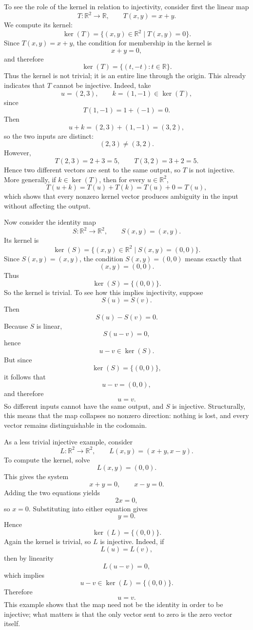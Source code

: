\documentclass[12pt]{article}
\begin{document}
	To see the role of the kernel in relation to injectivity, consider first the linear map
	\[
	T:\mathbb{R}^2\to\mathbb{R},\qquad T(x,y)=x+y.
	\]
	We compute its kernel:
	\[
	\ker(T)=\{(x,y)\in\mathbb{R}^2\mid T(x,y)=0\}.
	\]
	Since \(T(x,y)=x+y\), the condition for membership in the kernel is
	\[
	x+y=0,
	\]
	and therefore
	\[
	\ker(T)=\{(t,-t):t\in\mathbb{R}\}.
	\]
	Thus the kernel is not trivial; it is an entire line through the origin. This already indicates that \(T\) cannot be injective. Indeed, take
	\[
	u=(2,3), \qquad k=(1,-1)\in\ker(T),
	\]
	since
	\[
	T(1,-1)=1+(-1)=0.
	\]
	Then
	\[
	u+k=(2,3)+(1,-1)=(3,2),
	\]
	so the two inputs are distinct:
	\[
	(2,3)\neq(3,2).
	\]
	However,
	\[
	T(2,3)=2+3=5,
	\qquad
	T(3,2)=3+2=5.
	\]
	Hence two different vectors are sent to the same output, so \(T\) is not injective. More generally, if \(k\in\ker(T)\), then for every \(u\in\mathbb{R}^2\),
	\[
	T(u+k)=T(u)+T(k)=T(u)+0=T(u),
	\]
	which shows that every nonzero kernel vector produces ambiguity in the input without affecting the output.
	
	Now consider the identity map
	\[
	S:\mathbb{R}^2\to\mathbb{R}^2,\qquad S(x,y)=(x,y).
	\]
	Its kernel is
	\[
	\ker(S)=\{(x,y)\in\mathbb{R}^2\mid S(x,y)=(0,0)\}.
	\]
	Since \(S(x,y)=(x,y)\), the condition \(S(x,y)=(0,0)\) means exactly that
	\[
	(x,y)=(0,0).
	\]
	Thus
	\[
	\ker(S)=\{(0,0)\}.
	\]
	So the kernel is trivial. To see how this implies injectivity, suppose
	\[
	S(u)=S(v).
	\]
	Then
	\[
	S(u)-S(v)=0.
	\]
	Because \(S\) is linear,
	\[
	S(u-v)=0,
	\]
	hence
	\[
	u-v\in\ker(S).
	\]
	But since
	\[
	\ker(S)=\{(0,0)\},
	\]
	it follows that
	\[
	u-v=(0,0),
	\]
	and therefore
	\[
	u=v.
	\]
	So different inputs cannot have the same output, and \(S\) is injective. Structurally, this means that the map collapses no nonzero direction: nothing is lost, and every vector remains distinguishable in the codomain.
	
	As a less trivial injective example, consider
	\[
	L:\mathbb{R}^2\to\mathbb{R}^2,\qquad L(x,y)=(x+y,x-y).
	\]
	To compute the kernel, solve
	\[
	L(x,y)=(0,0).
	\]
	This gives the system
	\[
	x+y=0,\qquad x-y=0.
	\]
	Adding the two equations yields
	\[
	2x=0,
	\]
	so \(x=0\). Substituting into either equation gives
	\[
	y=0.
	\]
	Hence
	\[
	\ker(L)=\{(0,0)\}.
	\]
	Again the kernel is trivial, so \(L\) is injective. Indeed, if
	\[
	L(u)=L(v),
	\]
	then by linearity
	\[
	L(u-v)=0,
	\]
	which implies
	\[
	u-v\in\ker(L)=\{(0,0)\}.
	\]
	Therefore
	\[
	u=v.
	\]
	This example shows that the map need not be the identity in order to be injective; what matters is that the only vector sent to zero is the zero vector itself.
	
\end{document}
